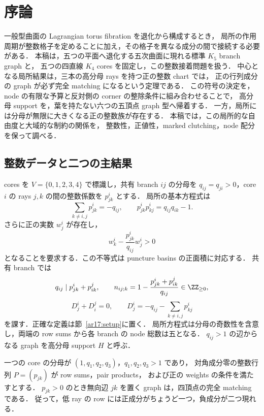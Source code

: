 \section{序論}
\label{ar17:introduction}

一般型曲面の Lagrangian torus fibration を退化から構成するとき，
局所の作用周期が整数格子を定めることに加え，その格子を異なる成分の間で接続する必要がある．
本稿は，五つの平面へ退化する五次曲面に現れる標準 $K_5$ branch graph と，
五つの四直線 $K_4$ cores を固定し，この整数接着問題を扱う．
中心となる局所結果は，三本の高分母 rays を持つ正の整数 chart では，
正の行列成分の graph が必ず完全 matching になるという定理である．
この符号の決定を，node の有限な予算と反対側の corner の整除条件に組み合わせることで，
高分母 support を，葉を持たない六つの五頂点 graph 型へ帰着する．
一方，局所には分母が無限に大きくなる正の整数族が存在する．
本稿では，この局所的な自由度と大域的な制約の関係を，
整数性，正値性，marked clutching，node 配分を保って調べる．

\subsection{整数データと二つの主結果}

cores を $V=\{0,1,2,3,4\}$ で標識し，共有 branch $ij$ の分母を
$q_{ij}=q_{ji}>0$，core $i$ の rays $j,k$ の間の整数係数を $p^i_{jk}$ とする．
局所の基本方程式は
\[
 \sum_{k\ne i,j}p^i_{jk}=-q_{ij},\qquad
 p^i_{jk}p^i_{kj}=q_{ij}q_{ik}-1.
\]
さらに正の実数 $w^i_j$ が存在し，
\[
 w^i_k-\frac{p^i_{jk}}{q_{ij}}w^i_j>0
\]
となることを要求する．この不等式は puncture basins の正面積に対応する．
共有 branch では
\[
 q_{ij}\mid p^i_{jk}+p^j_{ik},\qquad
 n_{ij;k}=1-\frac{p^i_{jk}+p^j_{ik}}{q_{ij}}\in\ZZ_{\ge0},
\]
\[
 D^i_j+D^j_i=0,\qquad
 D^i_j=-q_{ij}-\sum_{k\ne i,j}p^i_{kj}
\]
を課す．正確な定義は節~\ref{ar17:setup}に置く．
局所方程式は分母の奇数性を含意し，両端の row sums から各 branch の node 総数は五となる．
$q_{ij}>1$ の辺からなる graph を高分母 support $H$ と呼ぶ．

\begin{theorem}
\label{ar18:main-matching}
一つの core の分母が $(1,q_1,q_2,q_3)$，$q_1,q_2,q_3>1$ であり，
対角成分零の整数行列 $P=(p_{jk})$ が row sums，pair products，
および正の weights の条件を満たすとする．
$p_{jk}>0$ のとき無向辺 $jk$ を置く graph は，四頂点の完全 matching である．
従って，低 ray の row には正成分がちょうど一つ，負成分が二つ現れる．
\end{theorem}

